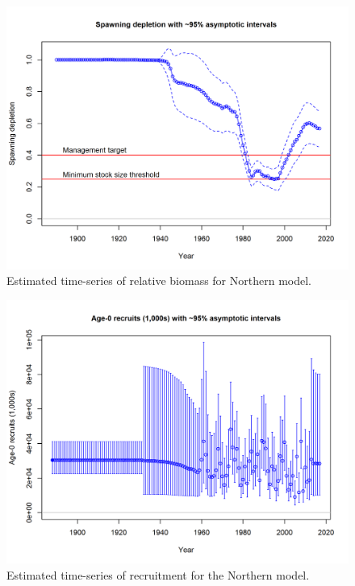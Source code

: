 \documentclass[12pt,]{article}
\begin{document}
\FloatBarrier

\begin{figure}[htbp]
\centering
\includegraphics{r4ss/plots_mod1/ts9_Spawning_depletion_with_95_asymptotic_intervals_intervals.png}
\caption{Estimated time-series of relative biomass for Northern model.
\label{fig:depl.N}}
\end{figure}

\FloatBarrier

\begin{figure}[htbp]
\centering
\includegraphics{r4ss/plots_mod1/ts11_Age-0_recruits_(1000s)_with_95_asymptotic_intervals.png}
\caption{Estimated time-series of recruitment for the Northern model.
\label{fig:recruits1.N}}
\end{figure}
\end{document}
